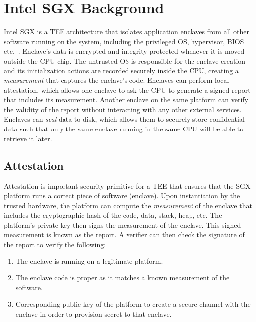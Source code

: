 \section{Intel SGX Background}
\label{ch:background:SGX}

Intel SGX is a TEE architecture that isolates application enclaves from all other software running on the system, including the privileged OS, hypervisor, BIOS etc.~\cite{sgxexplained}. Enclave's data is encrypted and integrity protected whenever it is moved outside the CPU chip. The untrusted OS is responsible for the enclave creation and its initialization actions are recorded securely inside the CPU, creating a \emph{measurement} that captures the enclave's code. Enclaves can perform local attestation, which allows one enclave to ask the CPU to generate a signed report that includes its measurement. Another enclave on the same platform can verify the validity of the report without interacting with any other external services. Enclaves can \emph{seal} data to disk, which allows them to securely store confidential data such that only the same enclave running in the same CPU will be able to retrieve it later.



\subsection{Attestation}

Attestation is important security primitive for a TEE that ensures that the SGX platform runs a correct piece of software (enclave). Upon instantiation by the trusted hardware, the platform can compute the \emph{measurement} of the enclave that includes the cryptographic hash of the code, data, stack, heap, etc. The platform's private key then signs the measurement of the enclave. This signed measurement is known as the report. A verifier can then check the signature of the report to verify the following:

\begin{enumerate}
  \item The enclave is running on a legitimate platform.
  \item The enclave code is proper as it matches a known measurement of the software.
  \item Corresponding public key of the platform to create a secure channel with the enclave in order to provision secret to that enclave.
\end{enumerate}  


